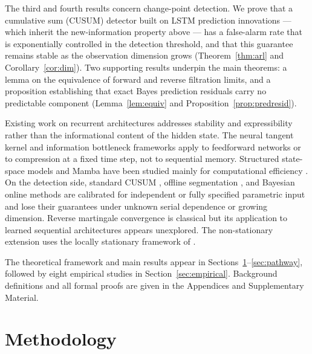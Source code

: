 \documentclass[bj,authoryear]{imsart}
\theoremstyle{plain}
\theoremstyle{definition}
\begin{document}
The third and fourth results concern change-point detection.
We prove that a cumulative sum (CUSUM) detector built on LSTM prediction
innovations --- which inherit the new-information property above ---
has a false-alarm rate that is exponentially controlled in the detection
threshold, and that this guarantee remains stable as the observation
dimension grows (Theorem~\ref{thm:arl} and Corollary~\ref{cor:dim}).
Two supporting results underpin the main theorems: a lemma on the
equivalence of forward and reverse filtration limits, and a proposition
establishing that exact Bayes prediction residuals carry no predictable
component (Lemma~\ref{lem:equiv} and Proposition~\ref{prop:predresid}).

Existing work on recurrent architectures addresses stability
and expressibility \citep{miller2019stable,miyato2018spectral,gonon2020reservoir}
rather than the informational content of the hidden state.
The neural tangent kernel \citep{jacot2018neural} and information bottleneck
\citep{tishby2015deep,saxe2019information} frameworks apply to feedforward
networks or to compression at a fixed time step, not to sequential memory.
Structured state-space models and Mamba \citep{gu2021efficiently,gu2023mamba}
have been studied mainly for computational efficiency
\citep{orvieto2023resurrecting}.
On the detection side, standard CUSUM \citep{page1954continuous,lorden1971procedures},
offline segmentation \citep{killick2012optimal}, and Bayesian online
methods \citep{adams2007bayesian} are calibrated for independent or fully
specified parametric input and lose their guarantees under unknown serial
dependence or growing dimension.
Reverse martingale convergence is classical
\citep{doob1953stochastic,neveu1975discrete,hall1980martingale} but
its application to learned sequential architectures appears unexplored.
The non-stationary extension uses the locally stationary framework of
\citet{dahlhaus1997fitting}.

The theoretical framework and main results appear in
Sections~\ref{sec:theory}--\ref{sec:pathway}, followed by eight empirical
studies in Section~\ref{sec:empirical}.
Background definitions and all formal proofs are given in the Appendices
and Supplementary Material.

\section{Methodology}
\label{sec:theory}
\end{document}
